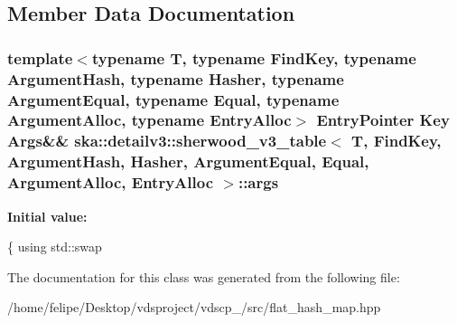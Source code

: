 \subsection{Member Data Documentation}
\subsubsection[{args}]{\setlength{\rightskip}{0pt plus 5cm}template$<$typename T, typename Find\+Key, typename Argument\+Hash, typename Hasher, typename Argument\+Equal, typename Equal, typename Argument\+Alloc, typename Entry\+Alloc$>$ Entry\+Pointer Key Args\&\& {\bf ska\+::detailv3\+::sherwood\+\_\+v3\+\_\+table}$<$ T, Find\+Key, Argument\+Hash, Hasher, Argument\+Equal, Equal, Argument\+Alloc, Entry\+Alloc $>$\+::args\hspace{0.3cm}{\ttfamily [private]}}\label{classska_1_1detailv3_1_1sherwood__v3__table_a931fdaa54363e9cd5ac181a4ac7e3af0}
{\bfseries Initial value\+:}
\begin{DoxyCode}
\{
        \textcolor{keyword}{using} std::swap
\end{DoxyCode}


The documentation for this class was generated from the following file\+:\begin{DoxyCompactItemize}
\item 
/home/felipe/\+Desktop/vdsproject/vdscp\+\_/src/flat\+\_\+hash\+\_\+map.\+hpp\end{DoxyCompactItemize}
